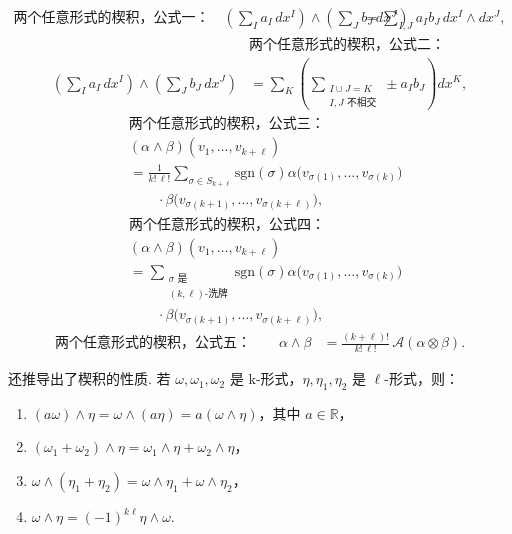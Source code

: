 \begin{align*}
\text{两个任意形式的楔积，公式一：}\quad
\left(\sum_{I}a_I\,dx^I\right)\wedge\left(\sum_{J}b_J\,dx^J\right)
&=\sum_{I,J}a_Ib_J\,dx^I\wedge dx^J,
\end{align*}
\begin{align*}
&\text{两个任意形式的楔积，公式二：}\\
\left(\sum_{I}a_I\,dx^I\right)\wedge\left(\sum_{J}b_J\,dx^J\right)
&=\sum_{K}\left(\sum_{\substack{I\cup J=K\\I,J\text{ 不相交}}}\pm a_Ib_J\right)dx^K,
\end{align*}
\begin{align*}
&\text{两个任意形式的楔积，公式三：}\\
&(\alpha\wedge\beta)(v_1,\ldots,v_{k+\ell})\\
&=\frac{1}{k!\,\ell!}\sum_{\sigma\in S_{k+\ell}}\mathrm{sgn}(\sigma)\alpha\bigl(v_{\sigma(1)},\ldots,v_{\sigma(k)}\bigr)\\
&\qquad\cdot\beta\bigl(v_{\sigma(k+1)},\ldots,v_{\sigma(k+\ell)}\bigr),
\end{align*}
\begin{align*}
&\text{两个任意形式的楔积，公式四：}\\
&(\alpha\wedge\beta)(v_1,\ldots,v_{k+\ell})\\
&=\sum_{\substack{\sigma\text{ 是}\\ (k,\ell)\text{-洗牌}}}\mathrm{sgn}(\sigma)\alpha\bigl(v_{\sigma(1)},\ldots,v_{\sigma(k)}\bigr)\\
&\qquad\cdot\beta\bigl(v_{\sigma(k+1)},\ldots,v_{\sigma(k+\ell)}\bigr),
\end{align*}
\begin{align*}
\text{两个任意形式的楔积，公式五：}\qquad
\alpha\wedge\beta&=\frac{(k+\ell)!}{k!\,\ell!}\,\mathcal{A}(\alpha\otimes\beta).
\end{align*}

还推导出了楔积的性质. 若 $\omega,\omega_1,\omega_2$ 是 k-形式，$\eta,\eta_1,\eta_2$ 是 $\ell$-形式，则：
\begin{enumerate}
  \item $(a\omega)\wedge\eta=\omega\wedge(a\eta)=a(\omega\wedge\eta)$，其中 $a\in\mathbb{R}$，
  \item $(\omega_1+\omega_2)\wedge\eta=\omega_1\wedge\eta+\omega_2\wedge\eta$，
  \item $\omega\wedge(\eta_1+\eta_2)=\omega\wedge\eta_1+\omega\wedge\eta_2$，
  \item $\omega\wedge\eta=(-1)^{k\ell}\eta\wedge\omega$.
\end{enumerate}

